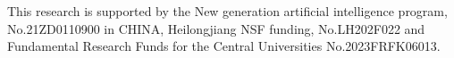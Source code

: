 \documentclass[acmsmall, screen]{acmart}
\begin{document}
\begin{acks}
  This research is supported by the New generation artificial intelligence program, No.21ZD0110900 in CHINA, Heilongjiang NSF funding, No.LH202F022 and 
  Fundamental Research Funds for the Central Universities No.2023FRFK06013.
\end{acks}





\appendix
\end{document}
